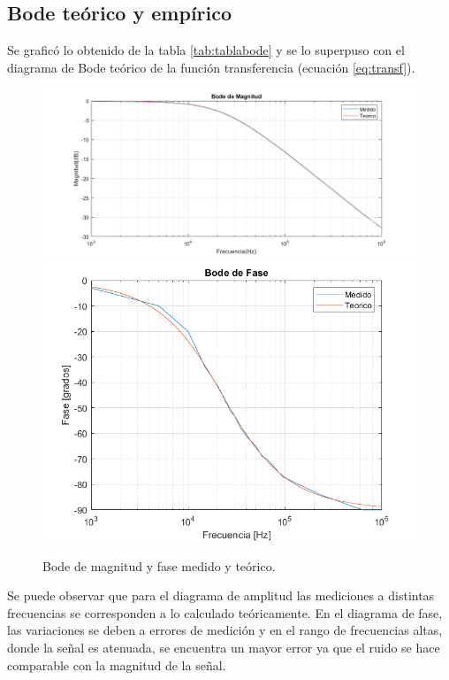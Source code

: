 \subsection{Bode teórico y empírico}
Se graficó lo obtenido de la tabla \ref{tab:tablabode} y se lo superpuso con el diagrama de Bode teórico de la función transferencia (ecuación \ref{eq:transf}).

\begin{figure}[H]
\centering
\includegraphics[scale=0.4]{1-4a.png}
\includegraphics[scale=0.5]{1-4b.png}
\caption{Bode de magnitud y fase medido y teórico.}
\label{fig:diagbode}
\end{figure}

Se puede observar que para el diagrama de amplitud las mediciones a distintas frecuencias se corresponden a lo calculado teóricamente. En el diagrama de fase, las variaciones se deben a errores de medición y en el rango de frecuencias altas, donde la señal es atenuada, se encuentra un mayor error ya que el ruido se hace comparable con la magnitud de la señal.

